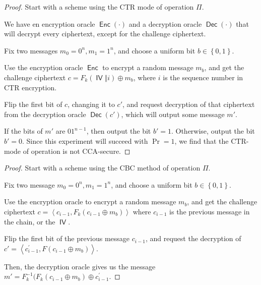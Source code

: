 \documentclass{article}
\DeclareMathOperator{\Enc}{\textsf{Enc}}
\DeclareMathOperator{\Dec}{\textsf{Dec}}
\DeclareMathOperator{\IV}{\textsf{IV}}
\begin{document}
\begin{enumerate}

    \begin{proof}
      Start with a scheme using the CTR mode of operation $\Pi$.

      We have en encryption oracle $\Enc(\cdot)$ and a decryption oracle
      $\Dec(\cdot)$ that will decrypt every ciphertext, except for the challenge
      ciphertext.

      Fix two messages $m_0 = 0^n, m_1 = 1^n$, and choose a uniform bit $b \in
      \left\{0, 1\right\}$.

      Use the encryption oracle $\Enc$ to encrypt a random message $m_b$, and
      get the challenge ciphertext $c = F_k(\IV \Vert i) \oplus m_b$, where $i$
      is the sequence number in CTR encryption.

      Flip the first bit of $c$, changing it to $c'$, and request decryption of
      that ciphertext from the decryption oracle $\Dec(c')$, which will output
      some message $m'$.

      If the bits of $m'$ are $0 1^{n - 1}$, then output the bit $b' = 1$.
      Otherwise, output the bit $b' = 0$. Since this experiment will succeed
      with $\Pr = 1$, we find that the CTR-mode of operation is not CCA-secure.
    \end{proof}


    \begin{proof}
      Start with a scheme using the CBC method of operation $\Pi$.

      Fix two message $m_0 = 0^n, m_1 = 1^n$, and choose a uniform bit $b \in
      \left\{0, 1\right\}$.

      Use the encryption oracle to encrypt a random message $m_b$, and get the
      challenge ciphertext $c = \left\langle c_{i - 1}, F_k(c_{i - 1} \oplus
      m_b)\right\rangle $ where $c_{i - 1}$ is
      the previous message in the chain, or the $\IV$.

      Flip the first bit of the previous message $c_{i - 1}$, and request the decryption of
      $c' = \left\langle c^{'}_{i - 1}, F(c_{i - 1} \oplus m_b)\right\rangle$.

      Then, the decryption oracle gives us the message $m' = F_{k}^{-1}(F_k(c_{i
      - 1} \oplus m_b) \oplus c^{'}_{i - 1}$.


\end{proof}
\end{enumerate}
\end{document}

